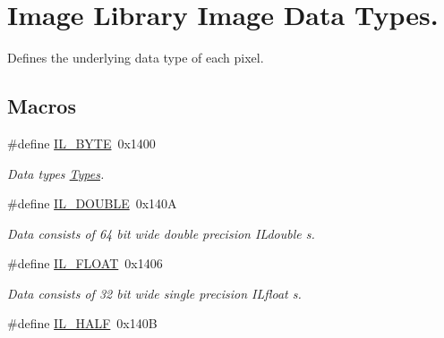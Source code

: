 \hypertarget{group__il__data__types}{\section{Image Library Image Data Types.}
\label{group__il__data__types}
}


Defines the underlying data type of each pixel.  


\subsection*{Macros}
\begin{DoxyCompactItemize}
\item 
\#define \hyperlink{group__il__data__types_ga5a1e68002c5c3108e1fea27cb8b75330}{I\+L\+\_\+\+B\+Y\+T\+E}~0x1400
\begin{DoxyCompactList}\small\item\em Data types \hyperlink{}{Types}. \end{DoxyCompactList}\item 
\hypertarget{group__il__data__types_ga323d29d399cf86d66569ec044016c7dc}{\#define \hyperlink{group__il__data__types_ga323d29d399cf86d66569ec044016c7dc}{I\+L\+\_\+\+D\+O\+U\+B\+L\+E}~0x140\+A}\label{group__il__data__types_ga323d29d399cf86d66569ec044016c7dc}

\begin{DoxyCompactList}\small\item\em Data consists of 64 bit wide double precision {\itshape I\+Ldouble} s. \end{DoxyCompactList}\item 
\hypertarget{group__il__data__types_ga2e425183c13c5fef66fd02322798e11c}{\#define \hyperlink{group__il__data__types_ga2e425183c13c5fef66fd02322798e11c}{I\+L\+\_\+\+F\+L\+O\+A\+T}~0x1406}\label{group__il__data__types_ga2e425183c13c5fef66fd02322798e11c}

\begin{DoxyCompactList}\small\item\em Data consists of 32 bit wide single precision {\itshape I\+Lfloat} s. \end{DoxyCompactList}\item 
\hypertarget{group__il__data__types_ga321b96d628cff640093c7e5004999338}{\#define \hyperlink{group__il__data__types_ga321b96d628cff640093c7e5004999338}{I\+L\+\_\+\+H\+A\+L\+F}~0x140\+B}\label{group__il__data__types_ga321b96d628cff640093c7e5004999338}


\end{DoxyCompactItemize}
